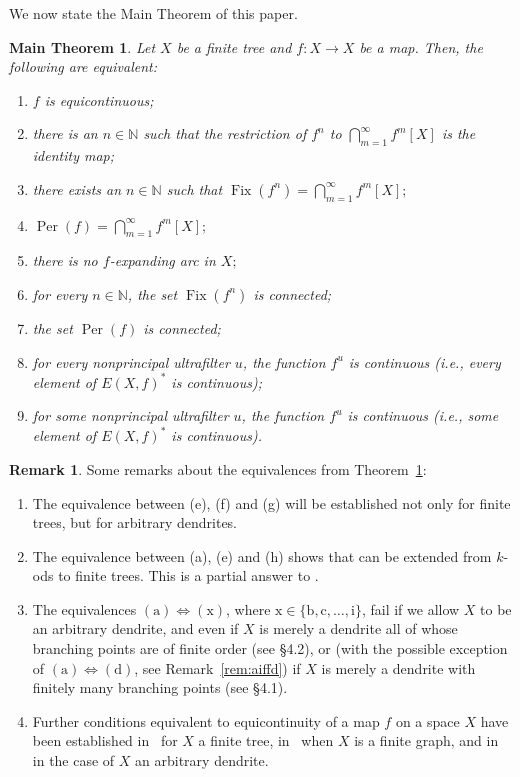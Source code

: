 \documentclass[12pt]{amsart}
\newtheorem{mainthm}[theorem]{Main Theorem}
\theoremstyle{definition}
\newtheorem{remark}[theorem]{Remark}
\numberwithin{equation}{section}
\DeclareMathOperator{\fix}{Fix}
\DeclareMathOperator{\per}{Per}
\begin{document}
We now state the Main Theorem of this paper.

\begin{mainthm}\label{mainthm}
Let $X$ be a finite tree and $f:X\longrightarrow X$ be a map. Then, the following are equivalent:
\begin{enumerate}
\item[\emph{(a)}] $f$ is equicontinuous;
\item[\emph{(b)}] there is an $n\in\mathbb N$ such that the restriction of $f^n$ to $\bigcap_{m=1}^\infty f^m[X]$ 
        is the identity map;
\item[\emph{(c)}] there exists an $n\in\mathbb N$ such that $\fix(f^n)=\bigcap_{m=1}^\infty f^m[X];$
\item[\emph{(d)}] $\per(f)=\bigcap_{m=1}^\infty f^m[X];$
\item[\emph{(e)}] there is no $f$-expanding arc in $X;$
\item[\emph{(f)}] for every $n\in\mathbb N$, the set $\fix(f^n)$ is connected;
\item[\emph{(g)}] the set $\per(f)$ is connected;
\item[\emph{(h)}] for every nonprincipal ultrafilter $u$, the function $f^u$ is continuous \emph{(}i.e., every element of 
        $E(X,f)^*$ is continuous\emph{)};
\item[\emph{(i)}] for some nonprincipal ultrafilter $u$, the function $f^u$ is continuous \emph{(}i.e., some element of 
        $E(X,f)^*$ is continuous\emph{)}.
\end{enumerate}
\end{mainthm}

\begin{remark}\label{aftermainthm}
Some remarks about the equivalences from Theorem~\ref{mainthm}:

\begin{enumerate}
\item The equivalence between (e), (f) and (g) will be established not only for finite trees, but for arbitrary dendrites.
\item The equivalence between (a), (e) and (h) shows that \cite[Theorem~3.7]{ivon-salvador} can be extended
         from $k$-ods to finite trees. This is a partial answer to \cite[Question~3.10]{ivon-salvador}.
\item The equivalences $(\mathrm{a})\iff(\mathrm{x})$, where $\mathrm{x}\in\{\mathrm{b},\mathrm{c},\ldots,\mathrm{i}\}$, fail if we allow $X$ to be an arbitrary dendrite, and 
         even if $X$ is merely a dendrite all of whose branching points are of finite order (see \S 4.2), or (with the 
         possible exception of $(\mathrm{a})\iff(\mathrm{d})$, see Remark~\ref{rem:aiffd}) if $X$ is merely a dendrite with finitely many 
         branching points (see \S 4.1).
\item Further conditions equivalent to equicontinuity of a map $f$ on a space $X$ have been established 
         in~\cite[Theorem~2, p.~62]{sun2} for $X$ a finite tree, in~\cite[Theorem~5.2]{mai} when $X$ is a finite graph, 
         and in~\cite[Theorem~4.12]{camargo-rincon-uzcategui} in the case of $X$ an arbitrary dendrite.
\end{enumerate}
\end{remark}
\end{document}
